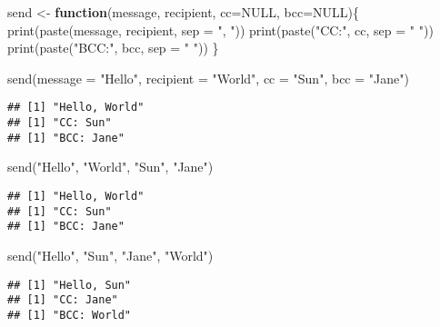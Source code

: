 \documentclass[
]{book}
\newenvironment{Shaded}{\begin{snugshade}}{\end{snugshade}}
\newcommand{\AttributeTok}[1]{\textcolor[rgb]{0.77,0.63,0.00}{#1}}
\newcommand{\ConstantTok}[1]{\textcolor[rgb]{0.00,0.00,0.00}{#1}}
\newcommand{\ControlFlowTok}[1]{\textcolor[rgb]{0.13,0.29,0.53}{\textbf{#1}}}
\newcommand{\FunctionTok}[1]{\textcolor[rgb]{0.00,0.00,0.00}{#1}}
\newcommand{\NormalTok}[1]{#1}
\newcommand{\OtherTok}[1]{\textcolor[rgb]{0.56,0.35,0.01}{#1}}
\newcommand{\StringTok}[1]{\textcolor[rgb]{0.31,0.60,0.02}{#1}}
\begin{document}
\begin{Shaded}
\begin{Highlighting}[]
\NormalTok{send }\OtherTok{\textless{}{-}} \ControlFlowTok{function}\NormalTok{(message, recipient, }\AttributeTok{cc=}\ConstantTok{NULL}\NormalTok{, }\AttributeTok{bcc=}\ConstantTok{NULL}\NormalTok{)\{}
  \FunctionTok{print}\NormalTok{(}\FunctionTok{paste}\NormalTok{(message, recipient, }\AttributeTok{sep =} \StringTok{", "}\NormalTok{))}
  \FunctionTok{print}\NormalTok{(}\FunctionTok{paste}\NormalTok{(}\StringTok{"CC:"}\NormalTok{, cc, }\AttributeTok{sep =} \StringTok{" "}\NormalTok{))}
  \FunctionTok{print}\NormalTok{(}\FunctionTok{paste}\NormalTok{(}\StringTok{"BCC:"}\NormalTok{, bcc, }\AttributeTok{sep =} \StringTok{" "}\NormalTok{))}
\NormalTok{\}}

\FunctionTok{send}\NormalTok{(}\AttributeTok{message =} \StringTok{"Hello"}\NormalTok{, }\AttributeTok{recipient =} \StringTok{"World"}\NormalTok{, }\AttributeTok{cc =} \StringTok{"Sun"}\NormalTok{, }\AttributeTok{bcc =} \StringTok{"Jane"}\NormalTok{)}
\end{Highlighting}
\end{Shaded}

\begin{verbatim}
## [1] "Hello, World"
## [1] "CC: Sun"
## [1] "BCC: Jane"
\end{verbatim}

\begin{Shaded}
\begin{Highlighting}[]
\FunctionTok{send}\NormalTok{(}\StringTok{"Hello"}\NormalTok{, }\StringTok{"World"}\NormalTok{, }\StringTok{"Sun"}\NormalTok{, }\StringTok{"Jane"}\NormalTok{)}
\end{Highlighting}
\end{Shaded}

\begin{verbatim}
## [1] "Hello, World"
## [1] "CC: Sun"
## [1] "BCC: Jane"
\end{verbatim}

\begin{Shaded}
\begin{Highlighting}[]
\FunctionTok{send}\NormalTok{(}\StringTok{"Hello"}\NormalTok{, }\StringTok{"Sun"}\NormalTok{, }\StringTok{"Jane"}\NormalTok{, }\StringTok{"World"}\NormalTok{)}
\end{Highlighting}
\end{Shaded}

\begin{verbatim}
## [1] "Hello, Sun"
## [1] "CC: Jane"
## [1] "BCC: World"
\end{verbatim}
\end{document}
